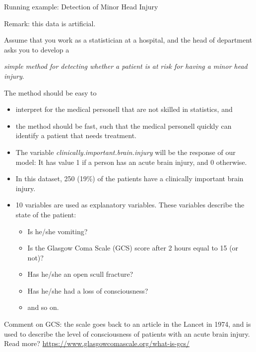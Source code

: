 \documentclass[ignorenonframetext,]{beamer}
\providecommand{\tightlist}{%
  \setlength{\itemsep}{0pt}\setlength{\parskip}{0pt}}
\begin{document}
\begin{frame}

\begin{block}{Running example: Detection of Minor Head Injury}

Remark: this data is artificial.

Assume that you work as a statistician at a hospital, and the head of
department asks you to develop a

\emph{simple method for detecting whether a patient is at risk for
having a minor head injury}.

The method should be easy to

\begin{itemize}
\tightlist
\item
  interpret for the medical personell that are not skilled in
  statistics, and
\item
  the method should be fast, such that the medical personell quickly can
  identify a patient that needs treatment.
\end{itemize}

\end{block}

\end{frame}

\begin{frame}

\begin{itemize}
\tightlist
\item
  The variable \emph{clinically.important.brain.injury} will be the
  response of our model: It has value 1 if a person has an acute brain
  injury, and 0 otherwise.
\item
  In this dataset, 250 (19\%) of the patients have a clinically
  important brain injury.
\item
  10 variables are used as explanatory variables. These variables
  describe the state of the patient:

  \begin{itemize}
  \tightlist
  \item
    Is he/she vomiting?
  \item
    Is the Glasgow Coma Scale (GCS) score after 2 hours equal to 15 (or
    not)?
  \item
    Has he/she an open scull fracture?
  \item
    Has he/she had a loss of consciousness?
  \item
    and so on.
  \end{itemize}
\end{itemize}

Comment on GCS: the scale goes back to an article in the Lancet in 1974,
and is used to describe the level of consciousness of patients with an
acute brain injury. Read more?
\url{https://www.glasgowcomascale.org/what-is-gcs/}

\end{frame}
\end{document}
